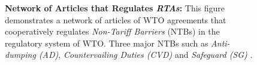 \begin{figure}[h]
    \centering{
        
    }
    \caption{{\bf Network of Articles that Regulates \textit{RTAs}:}
        This figure demonstrates a network of articles of WTO agreements
        that cooperatively regulates \textit{Non-Tariff Barriers} (NTBs) in the regulatory system of WTO.
        Three major NTBs such as \textit{Anti-dumping (AD)}, \textit{Countervailing Duties (CVD)}
        and \textit{Safeguard (SG)} .
    }
    \label{fig:rta-explained}
\end{figure}